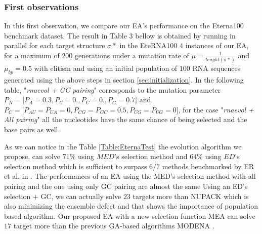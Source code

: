 \documentclass[english,12pt,a4paper]{article}
\theoremstyle{definition}
\begin{document}
\subsubsection{First observations}
In this first observation, we compare  our EA's performance on the Eterna100 benchmark dataset.  The result in Table 3 bellow is obtained by running in parallel for each target structure  $\sigma*$ in the EteRNA100 $4$ instances of our EA, for a maximum of $200$ generations under a mutation rate of $\mu = \frac{1}{lenght(\sigma*)}$ and $\mu_{bp} = 0.5$ with elitism and using an initial population of $100$ RNA sequences generated using the above steps in section  \ref{sec:initialization}.  In the following table, "\textit{rnaevol + GC pairing}"  corresponds to the mutation parameter $P_N = \big[P_A=0.3,P_U= 0., P_C=0.,P_G=0.7\big]$ and 
$ P_C = \big[ P_{AU}=P_{UA}=0,P_{CG}=P_{GC}=0.5,P_{UG}=P_{UG}=0 \big] $, for the case "\textit{rnaevol + All pairing}"  all the nucleotides have the same chance of being selected and the base pairs as well.

As we can notice in the Table \ref{Table:EternaTest}  the  evolution algorithm we propose, can solve $71\%$ using $MED$'s selection method and $64 \%$  using $ED$'s selection method which is sufficient to surpass $6/7$ methods benchmarked by ER et al. in \cite{shi2018sentrna}. The performances of an EA using the MED's selection method  with all pairing and the one using only GC pairing are almost the same  Using an ED's selection  + GC, we can actually solve $23$ targets more than NUPACK which is also minimizing the ensemble defect and that shows the importance of population based algorithm.  Our proposed EA with a new selection function MEA can solve $17$ target more than the previous GA-based algorithms MODENA \cite{taneda2011modena} \cite{esmaili2014evolutionary}.
\end{document}
